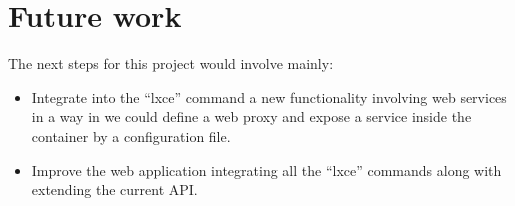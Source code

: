 \section{Future work}
The next steps for this project would involve mainly:
\begin{itemize}
	\item{Integrate into the ``lxce'' command a new functionality involving web services in a way in we could define a web proxy and expose a service inside the container by a configuration file.}
	\item{Improve the web application integrating all the ``lxce'' commands along with extending the current API.}
\end{itemize}
